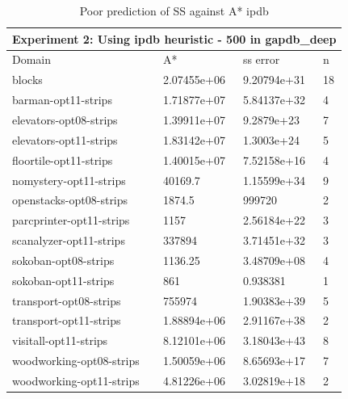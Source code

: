 \documentclass[a4paper,12pt]{article}
\begin{document}
\begin{table}[]
\centering
\caption{Poor prediction of SS against A* ipdb}
\label{my-label}
\begin{tabular}{l|l|l|l}
\hline
\multicolumn{4}{l}{Experiment 2: Using ipdb heuristic - 500 in gapdb\_deep} \\ \hline
Domain& A*& ss error& n \\ \hline

blocks& 2.07455e+06& 9.20794e+31& 18\\ \hline
barman-opt11-strips& 1.71877e+07& 5.84137e+32& 4\\ \hline
elevators-opt08-strips& 1.39911e+07& 9.2879e+23& 7\\ \hline
elevators-opt11-strips& 1.83142e+07& 1.3003e+24& 5\\ \hline
floortile-opt11-strips& 1.40015e+07& 7.52158e+16& 4\\ \hline
nomystery-opt11-strips& 40169.7& 1.15599e+34& 9\\ \hline
openstacks-opt08-strips& 1874.5& 999720& 2\\ \hline
parcprinter-opt11-strips& 1157& 2.56184e+22& 3\\ \hline
scanalyzer-opt11-strips& 337894& 3.71451e+32& 3\\ \hline
sokoban-opt08-strips& 1136.25& 3.48709e+08& 4\\ \hline
sokoban-opt11-strips& 861& 0.938381& 1\\ \hline
transport-opt08-strips& 755974& 1.90383e+39& 5\\ \hline
transport-opt11-strips& 1.88894e+06& 2.91167e+38& 2\\ \hline
visitall-opt11-strips& 8.12101e+06& 3.18043e+43& 8\\ \hline
woodworking-opt08-strips& 1.50059e+06& 8.65693e+17& 7\\ \hline
woodworking-opt11-strips& 4.81226e+06& 3.02819e+18& 2\\ \hline
\end{tabular}
\end{table}
\end{document}
